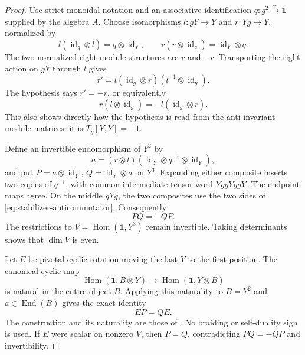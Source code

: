 \begin{proof}
Use strict monoidal notation and an associative identification
$q:g^2\xrightarrow\sim\mathbf1$ supplied by the algebra $A$.
Choose isomorphisms $l:gY\to Y$ and $r:Yg\to Y$, normalized by
\[
 l(\operatorname{id}_g\otimes l)=q\otimes\operatorname{id}_Y,
 \qquad r(r\otimes\operatorname{id}_g)=\operatorname{id}_Y\otimes q.
\]
The two normalized right module structures are $r$ and $-r$.
Transporting the right action on $gY$ through $l$ gives
\[
 r'=l(\operatorname{id}_g\otimes r)(l^{-1}\otimes\operatorname{id}_g).
\]
The hypothesis says $r'=-r$, or equivalently
\begin{equation}\label{eq:stabilizer-anticommutator}
 r(l\otimes\operatorname{id}_g)=-l(\operatorname{id}_g\otimes r).
\end{equation}
This also shows directly how the hypothesis is read from the
anti-invariant module matrices: it is $T_g[Y,Y]=-1$.

Define an invertible endomorphism of $Y^2$ by
\[
 a=(r\otimes l)(\operatorname{id}_Y\otimes q^{-1}\otimes\operatorname{id}_Y),
\]
and put $P=a\otimes\operatorname{id}_Y$, $Q=\operatorname{id}_Y\otimes a$ on $Y^3$.
Expanding either composite inserts two copies of $q^{-1}$, with common
intermediate tensor word $YggYggY$. The endpoint maps agree. On the
middle $gYg$, the two composites use the two sides of
\eqref{eq:stabilizer-anticommutator}. Consequently
\[
 PQ=-QP.
\]
The restrictions to $V=\operatorname{Hom}(\mathbf1,Y^3)$ remain
invertible. Taking determinants shows that $\dim V$ is even.

Let $E$ be pivotal cyclic rotation moving the last $Y$ to the first
position. The canonical cyclic map
\[
 \operatorname{Hom}(\mathbf1,B\otimes Y)
 \longrightarrow \operatorname{Hom}(\mathbf1,Y\otimes B)
\]
is natural in the entire object $B$. Applying this naturality to
$B=Y^2$ and $a\in\operatorname{End}(B)$ gives the exact identity
\[
 EP=QE.
\]
The construction and its naturality are those of
\cite[Definition~3.1, Lemma~3.4 and Theorem~5.1]{NSpiv}.
No braiding or self-duality sign is used. If $E$ were scalar on nonzero
$V$, then $P=Q$, contradicting $PQ=-QP$ and invertibility.


\end{proof}
